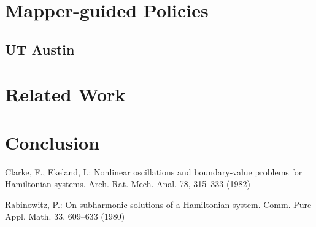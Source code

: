\documentclass{llncs}
\begin{document}
\section{Mapper-guided Policies}
\subsection{UT Austin}
\section{Related Work}
\section{Conclusion}

%
%

\begin{thebibliography}{5}
%
Clarke, F., Ekeland, I.:
Nonlinear oscillations and
boundary-value problems for Hamiltonian systems.
Arch. Rat. Mech. Anal. 78, 315--333 (1982)

Rabinowitz, P.:
On subharmonic solutions of a Hamiltonian system.
Comm. Pure Appl. Math. 33, 609--633 (1980)

\end{thebibliography}

\clearpage
%
\end{document}

